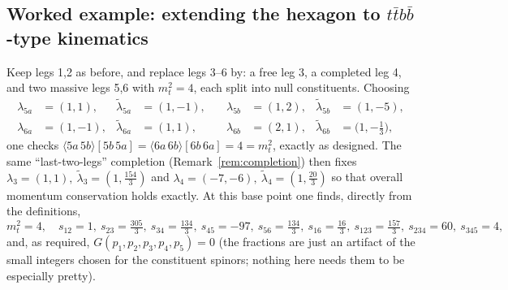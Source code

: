 \documentclass[11pt]{article}
\newcommand{\ang}[2]{\langle #1\,#2\rangle}
\newcommand{\sq}[2]{[#1\,#2]}
\newcommand{\lam}{\lambda}
\newcommand{\lt}{\tilde\lambda}
\theoremstyle{definition}
\begin{document}
\subsection{Worked example: extending the hexagon to $t\bar t b\bar b$-type kinematics}

Keep legs 1,2 as before, and replace legs 3--6 by: a free leg 3, a completed leg 4, and two
massive legs 5,6 with $m_t^2=4$, each split into null constituents. Choosing
\begin{equation}
\begin{aligned}
\lam_{5a}&=(1,1), & \lt_{5a}&=(1,-1), &\quad \lam_{5b}&=(1,2), & \lt_{5b}&=(1,-5),\\
\lam_{6a}&=(1,-1), & \lt_{6a}&=(1,1), &\quad \lam_{6b}&=(2,1), & \lt_{6b}&=\big(1,-\tfrac13\big),
\end{aligned}
\end{equation}
one checks $\ang{5a}{5b}\sq{5b}{5a}=\ang{6a}{6b}\sq{6b}{6a}=4=m_t^2$, exactly as designed. The
same ``last-two-legs'' completion (Remark~\ref{rem:completion}) then fixes
$\lam_3=(1,1),\ \lt_3=(1,\tfrac{154}{3})$ and $\lam_4=(-7,-6),\ \lt_4=(1,\tfrac{20}{3})$ so that
overall momentum conservation holds exactly. At this base point one finds, directly from the
definitions,
\begin{equation}
m_t^2 = 4,\quad s_{12}=1,\ s_{23}=\tfrac{305}{3},\ s_{34}=\tfrac{134}{3},\ s_{45}=-97,\
s_{56}=\tfrac{134}{3},\ s_{16}=\tfrac{16}{3},\ s_{123}=\tfrac{157}{3},\ s_{234}=60,\ s_{345}=4,
\end{equation}
and, as required, $G(p_1,p_2,p_3,p_4,p_5)=0$ (the fractions are just an artifact of the small
integers chosen for the constituent spinors; nothing here needs them to be especially pretty).
\end{document}
